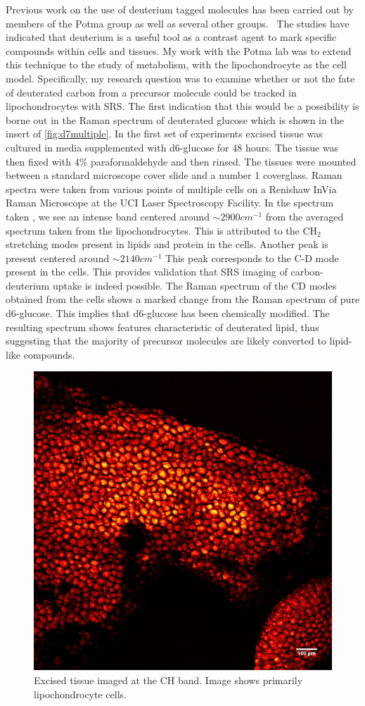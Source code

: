 Previous work on the use of deuterium tagged molecules has been carried out by members of the Potma group as well as several other groups.~\cite{Hou2503,Alfonso-Garcia2015,Wei:2016aa}  The studies have indicated that deuterium is a useful tool as a contrast agent to mark specific compounds within cells and tissues. My work with the Potma lab was to extend this technique to the study of metabolism, with the lipochondrocyte as the cell model. Specifically, my research question was to examine whether or not the fate of deuterated carbon from a precursor molecule could be tracked in lipochondrocytes with SRS. The first indication that this would be a possibility is borne out in the Raman spectrum of deuterated glucose which is shown in the insert of \ref{fig:d7multiple}. In the first set of experiments excised tissue was cultured in media supplemented with d6-glucose for 48 hours.  The tissue was then fixed with $4\%$ paraformaldehyde and then rinsed.  The tissues were mounted between a standard microscope cover slide and a number 1 coverglass.  Raman spectra were taken from various points of multiple cells on a Renishaw InVia Raman Microscope at the UCI Laser Spectroscopy Facility. In the spectrum taken , we see an intense band centered around $\sim2900cm^{-1}$ from the averaged spectrum taken from the lipochondrocytes. This is attributed to the CH$_2$ stretching modes present in lipids and protein in the cells.  Another peak is present centered around $\sim2140cm^{-1}$  This peak corresponds to the C-D mode present in the cells.  This provides validation that SRS imaging of carbon-deuterium uptake is indeed possible.  The Raman spectrum of the CD modes obtained from the cells shows a marked change from the Raman spectrum of pure d6-glucose. This implies that d6-glucose has been chemically modified. The resulting spectrum shows features characteristic of deuterated lipid, thus suggesting that the majority of precursor molecules are likely converted to lipid-like compounds. 

\begin{figure}[h]
    \centering
    \includegraphics[width=0.5\linewidth]{Figures/2-methyl.jpg}
    \caption{Excised tissue imaged at the CH band.  Image shows primarily lipochondrocyte cells.}  
    \label{fig:Lipo-Methyl}
\end{figure}

